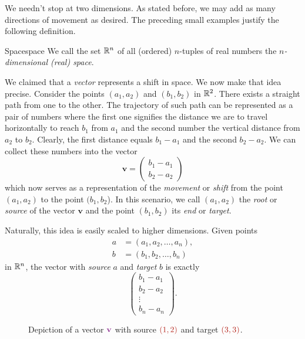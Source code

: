 We needn't stop at two dimensions. As stated before, we may add as many
directions of movement as desired. The preceding small examples justify the
following definition.

\begin{definition}{Space}{space}
 We call the set $\mathbb{R}^{n}$ of all (ordered) $n$-tuples of real numbers the
 \emph{$n$-dimensional (real) space}. 
\end{definition}

We claimed that a \emph{vector} represents a shift in space. We now make that
idea precise. Consider the points $(a_1,a_2)$ and $(b_1,b_2)$ in $\mathbb{R}^2$. There
exists a straight path from one to the other. The trajectory of such path can be
represented as a pair of numbers where the first one signifies the distance we
are to travel horizontally to reach $b_1$ from $a_1$ and the second number the
vertical distance from $a_2$ to $b_2$. Clearly, the first distance equals $b_1 -
a_1$ and the second $b_2 - a_2$. We can collect these numbers into the vector
\[
 \mathbf{v} = 
 \begin{pmatrix}
  b_1 - a_1\\
  b_2 - a_2
 \end{pmatrix}
\]
which now serves as a representation of the \emph{movement} or \emph{shift} from
the point $(a_1,a_2)$ to the point $(b_1,b_2$). In this scenario, we call
$(a_1,a_2)$ the \emph{root} or \emph{source} of the vector $\mathbf{v}$ and the
point $(b_1,b_2)$ its \emph{end} or \emph{target}.

Naturally, this idea is easily scaled to higher dimensions. Given points
\begin{align*}
 a &= (a_1,a_2,\ldots,a_n),\\
 b &= (b_1,b_2,\ldots,b_n)
\end{align*}
in $\mathbb{R}^{n}$, the vector with \emph{source} $a$ and \emph{target} $b$ is exactly
\[
 \begin{pmatrix}
  b_1 - a_1\\
  b_2 - a_2\\
  \vdots\\
  b_n - a_n
 \end{pmatrix}.
\]
\begin{figure}[ht]
 \centering
 \caption{Depiction of a vector $\clm{\mathbf{v}}$ with source $\clr{(1,2)}$ and
 target $\clr{(3,3)}$.}
 \label{fig:vector}
\end{figure}

